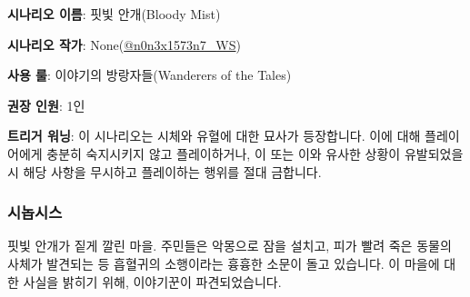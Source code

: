 \documentclass{report}
\begin{document}
	\textbf{시나리오 이름}: 핏빛 안개(Bloody Mist)
	
	\textbf{시나리오 작가}: None(\href{https://www.twitter.com/n0n3x1573n7_WS}{@n0n3x1573n7\_WS})
	
	\textbf{사용 룰}: 이야기의 방랑자들(Wanderers of the Tales)
	
	\textbf{권장 인원}: 1인
	
	\textbf{트리거 워닝}: 이 시나리오는 시체와 유혈에 대한 묘사가 등장합니다. 이에 대해 플레이어에게 충분히 숙지시키지 않고 플레이하거나, 이 또는 이와 유사한 상황이 유발되었을 시 해당 사항을 무시하고 플레이하는 행위를 절대 금합니다.
	
	\subsubsection*{시놉시스}
	핏빛 안개가 짙게 깔린 마을. 주민들은 악몽으로 잠을 설치고, 피가 빨려 죽은 동물의 사체가 발견되는 등 흡혈귀의 소행이라는 흉흉한 소문이 돌고 있습니다. 이 마을에 대한 사실을 밝히기 위해, 이야기꾼이 파견되었습니다.
\end{document}

